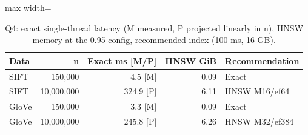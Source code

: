 \begin{table}[!t]
\centering
\footnotesize
\begin{adjustbox}{max width=\linewidth}
\begin{tabular}{lrrrl}
\toprule
Data & n & Exact ms [M/P] & HNSW GiB & Recommendation \\
\midrule
SIFT & 150,000 & 4.5 [M] & 0.09 & Exact \\
SIFT & 10,000,000 & 324.9 [P] & 6.11 & HNSW M16/ef64 \\
GloVe & 150,000 & 3.3 [M] & 0.09 & Exact \\
GloVe & 10,000,000 & 245.8 [P] & 6.26 & HNSW M32/ef384 \\
\bottomrule
\end{tabular}
\end{adjustbox}
\caption{Q4: exact single-thread latency (M measured, P projected linearly in n), HNSW memory at the 0.95 config, recommended index (100 ms, 16 GB).}
\label{tab:q4c}
\end{table}
